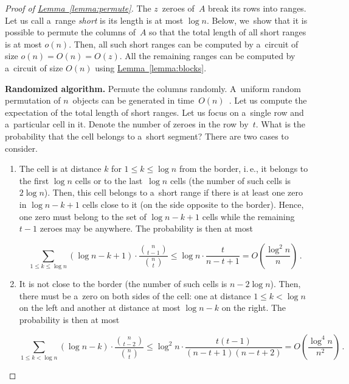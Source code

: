 \documentclass[11pt]{article}
\numberwithin{equation}{section}
\theoremstyle{definition}
\theoremstyle{plain}
\newcommand{\ie}{i.\,e.}
\newcommand{\expref}[2]{\hyperref[#2]{#1~\ref{#2}}}
\theoremstyle{plain}\newtheorem{observation}[theorem]{Observation}
\begin{document}
\begin{proof}[Proof of {\expref{Lemma}{lemma:permute}}]
    The $z$~zeroes of~$A$ break its rows into ranges.
    Let us call a~range \emph{short} is its length is at most $\log n$.
    Below, we~show that it is possible to permute the columns of~$A$
    so that the total length of all short ranges is at most $o(n)$.
    Then, all such short ranges can be computed by a~circuit of size
    $o(n)=O(n)=O(z)$. All the remaining ranges can be
    computed by a~circuit of size $O(n)$ using \expref{Lemma}{lemma:blocks}.

    \textbf{Randomized algorithm.}
    Permute the columns randomly. A~uniform random permutation
    of $n$~objects can be generated in
    time~$O(n)$~\cite[Algorithm~P (Shuffling)]{DBLP:books/lib/Knuth98}.
    Let us compute the expectation of
    the total length of short ranges.
    Let us focus on a~single row and a~particular cell in it. Denote the number of
    zeroes in the row by~$t$. What is the probability that the cell belongs to
    a~short segment? There are two cases to consider.


    \begin{enumerate}
        \item The cell is at distance $k$ for $1 \le k \le \log n$ from the border,
        \ie, it belongs to the first $\log n$ cells or to the last~$\log n$ cells
        (the number of such cells is $2\log n$). Then,
        this cell belongs to a~short range if there is at least one zero
        in $\log n - k + 1$ cells close to it (on the side opposite to the border).
        Hence, one zero must belong to the set of $\log n - k + 1$ cells while the
        remaining $t-1$ zeroes may be anywhere. The probability is then at most

        \[\sum_{1 \le k \le \log n}(\log n - k + 1) \cdot \frac{\binom{n}{t-1}}{\binom{n}{t}} \le \log n \cdot \frac{t}{n-t+1}=O\left(\frac{\log^2n}{n}\right) \, .\]

        \item It is not close to the border (the number of such cells is $n-2\log n$).
        Then, there must be a~zero on both sides of the cell: one at
        distance $1 \le k < \log n$ on the left and another at distance at most
        $\log n - k$ on the right. The probability is then at most

        \[\sum_{1 \le k < \log n}(\log n - k) \cdot \frac{\binom{n}{t-2}}{\binom{n}{t}} \le \log^2n \cdot \frac{t(t-1)}{(n-t+1)(n-t+2)}=O\left(\frac{\log^4 n}{n^2}\right) \, .\]


\end{enumerate}
\end{proof}
\end{document}

